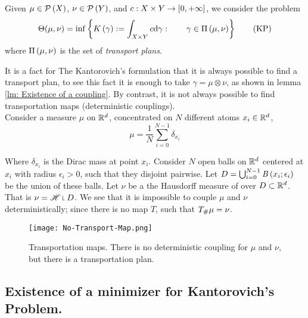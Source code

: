 \begin{problem}Given $\mu \in \mathcal{P}\left( X \right)$, $\nu \in \mathcal{P}\left( Y \right)$, and $c: X\times Y \rightarrow \left[ 0, +\infty \right]$, we consider the problem
	\begin{equation}
		\Theta(\mu, \nu)=\inf\left\lbrace K\left(\gamma\right) := \int_{X\times Y} c \mathrm{d}\gamma : \qquad \gamma \in \Pi\left(\mu, \nu\right) \right\rbrace\label{eq: Kantorovich's Problem.}\tag{KP}
	\end{equation}
where $\Pi\left(\mu, \nu\right)$ is the set of \textit{transport plans}.
\end{problem}

It is a fact for The Kantorovich's formulation that it is always possible to find a transport plan, to see this fact it is enough to take $\gamma=\mu\otimes \nu$, as shown in lemma \ref{lm: Existence of a coupling}. By contrast, it is not always possible to find transportation maps (deterministic couplings).\\

Consider a measure $\mu$ on $\mathbb{R}^d$, concentrated on $N$ different atoms $x_i \in \mathbb{R}^d$, 
\begin{equation*}
\mu=\frac{1}{N}\sum_{i=0}^{N-1} \delta_{x_i}
\end{equation*} 

Where $\delta_{x_i}$ is the Dirac mass at point $x_i$. Consider $N$ open balls on $\mathbb{R}^d$ centered at $x_i$ with radius $\epsilon_i > 0$, such that they disjoint pairwise. Let $D=\bigcup_{i=0}^{N-1} \mathit{B}\left( x_i; \epsilon_i \right)$ be the union of these balls. Let $\nu$ be a the Hausdorff measure of over $D\subset \mathbb{R}^d$. That is $\nu=\Hausdorff\measurerestr D$. We see that it is impossible to couple $\mu$ and $\nu$ deterministically; since there is no map $T$, such that ${T}_{\#} \mu=\nu$. \\

\begin{figure}[H]	
	\begin{center}
	\caption{Transportation maps. There is no deterministic coupling for $\mu$ and $\nu$, but there is a transportation plan.}
	\texttt{[image: No-Transport-Map.png]}
	\label{fig: No deterministic coupling.}
	\end{center}	
\end{figure}



\subsection{Existence of a minimizer for Kantorovich's Problem.}


